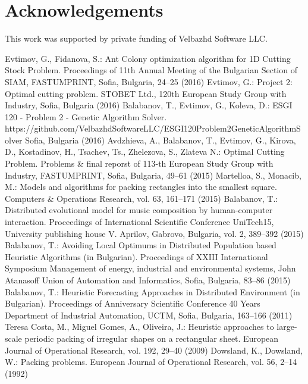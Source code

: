 \documentclass{llncs}
\begin{document}
\section*{Acknowledgements}
%
%
This work was supported by private funding of Velbazhd Software LLC.
%
%
\begin{thebibliography}{}
%
Evtimov, G., Fidanova, S.:
Ant Colony optimization algorithm for 1D Cutting Stock Problem.
Proceedings of 11th Annual Meeting of the Bulgarian Section of SIAM, FASTUMPRINT, Sofia, Bulgaria, 24--25 (2016)
%
Evtimov, G.:
Project 2: Optimal cutting problem.
STOBET Ltd., 120th European Study Group with Industry, Sofia, Bulgaria  (2016)
%
Balabanov, T., Evtimov, G., Koleva, D.:
ESGI 120 - Problem 2 - Genetic Algorithm Solver.
https://github.com/VelbazhdSoftwareLLC/ESGI120Problem2GeneticAlgorithmSolver Sofia, Bulgaria  (2016)
%
Avdzhieva, A., Balabanov, T., Evtimov, G., Kirova, D., Kostadinov, H., Tsachev, Ts., Zhelezova, S., Zlateva N.:
Optimal Cutting Problem.
Problems \& final reporst of 113-th European Study Group with Industry, FASTUMPRINT, Sofia, Bulgaria, 49--61 (2015)
%
Martelloa, S., Monacib, M.:
Models and algorithms for packing rectangles into the smallest square.
Computers \& Operations Research, vol. 63, 161--171 (2015)
%
Balabanov, T.:
Distributed evolutional model for music composition by human-computer interaction.
Proceedings of International Scientific Conference UniTech15, University publishing house V. Aprilov, Gabrovo, Bulgaria, vol. 2, 389--392 (2015)
%
Balabanov, T.:
Avoiding Local Optimums in Distributed Population based Heuristic Algorithms (in Bulgarian).
Proceedings of XXIII International Symposium Management of energy, industrial and environmental systems, John Atanasoff Union of Automation and Informatics, Sofia, Bulgaria, 83--86 (2015)
%
Balabanov, T.:
Heuristic Forecasting Approaches in Distributed Environment (in Bulgarian).
Proceedings of Anniversary Scientific Conference 40 Years Department of Industrial Automation, UCTM, Sofia, Bulgaria, 163--166 (2011)
%
Teresa Costa, M.,  Miguel Gomes, A., Oliveira, J.:
Heuristic approaches to large-scale periodic packing of irregular shapes on a rectangular sheet.
European Journal of Operational Research, vol. 192, 29--40 (2009)
%
Dowsland, K., Dowsland, W.:
Packing problems.
European Journal of Operational Research, vol. 56, 2--14 (1992)
%
\end{thebibliography}
\end{document}

